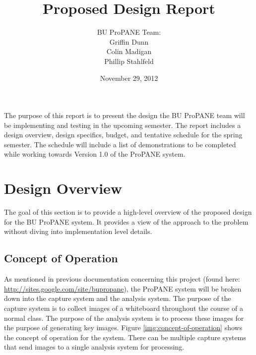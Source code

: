\documentclass[]{article}
\begin{document}
	\setlength{\parindent}{0pt}
	\setlength{\parskip}{6pt}

	\begin{titlepage}



		\title{\textbf{Proposed Design Report}}
		\author{BU ProPANE Team:\\Griffin Dunn\\Colin Madigan\\Phillip Stahlfeld}
		\date{November 29, 2012}
		\maketitle



		\noindent
		The purpose of this report is to present the design the BU ProPANE team will be implementing and testing in the upcoming semester. The report includes a design overview, design specifics, budget, and tentative schedule for the spring semester. The schedule will include a list of demonstrations to be completed while working towards Version 1.0 of the ProPANE system. 
		\thispagestyle{empty}
		
		
		
	\end{titlepage}
	
	
	
	
	\tableofcontents
	\newpage
	
	\setcounter{page}{1}
	\thispagestyle{empty}
	
	\section{Design Overview}
		The goal of this section is to provide a high-level overview of the proposed design for the BU ProPANE system. It provides a view of the approach to the problem without diving into implementation level details. 
		
		\subsection{Concept of Operation}
			As mentioned in previous documentation concerning this project (found here: \url{http://sites.google.com/site/bupropane}), the ProPANE system will be broken down into the capture system and the analysis system. The purpose of the capture system is to collect images of a whiteboard throughout the course of a normal class. The purpose of the analysis system is to process these images for the purpose of generating key images. Figure \ref{img:concept-of-operation} shows the concept of operation for the system. There can be multiple capture systems that send images to a single analysis system for processing. 
			
\end{document}
